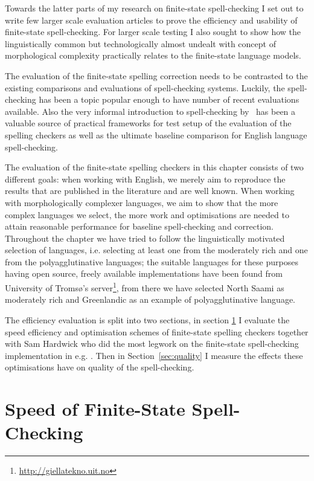 \documentclass[officiallayout]{unihelcompling}
\begin{document}
Towards the latter parts of my research on finite-state spell-checking I set
out to write few larger scale evaluation articles to prove the efficiency and
usability of finite-state spell-checking. For larger scale testing I also
sought to show how the linguistically common but technologically almost undealt
with concept of morphological complexity practically relates to the
finite-state language models.

The evaluation of the finite-state spelling correction needs to be contrasted
to the existing comparisons and evaluations of spell-checking systems. Luckily,
the spell-checking has been a topic popular enough to have number of recent
evaluations available.  Also the very informal introduction to spell-checking
by~\citep{norvig2010howto} has been a valuable source of practical frameworks
for test setup of the evaluation of the spelling checkers as well as the
ultimate baseline comparison for English language spell-checking.

The evaluation of the finite-state spelling checkers in this chapter consists
of two different goals: when working with English, we merely aim to reproduce
the results that are published in the literature and are well known. When
working with morphologically complexer languages, we aim to show that the more
complex languages we select, the more work and optimisations are needed to
attain reasonable performance for baseline spell-checking and correction.
Throughout the chapter we have tried to follow the linguistically motivated
selection of languages, i.e. selecting at least one from the moderately rich
and one from the polyagglutinative languages; the suitable languages for these
purposes having open source, freely available implementations have been found
from University of Tromsø's server\footnote{\url{http://giellatekno.uit.no}},
from there we have selected North Saami as moderately rich and Greenlandic as
an example of polyagglutinative language.

The efficiency evaluation is split into two sections, in section
\ref{sec:speed} I evaluate the speed efficiency and optimisation schemes of
finite-state spelling checkers together with Sam Hardwick who did the
most legwork on the finite-state spell-checking implementation in e.g.
\citep{linden2011hfst}. Then in Section~\ref{sec:quality} I measure the
effects these optimisations have on quality of the spell-checking.

\section{Speed of Finite-State Spell-Checking}
\label{sec:speed}
\end{document}
